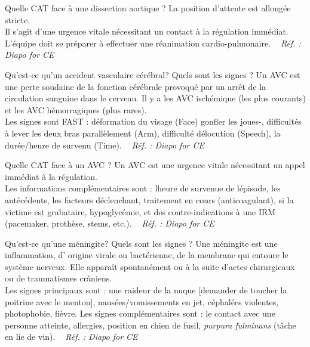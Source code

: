 \documentclass[grid,avery5371,landscape]{flashcards}
\makeatletter
\newcounter{nocarte}
\newcommand{\categ}[1]{%
  \def\@categ{#1}%
  \setcounter{nocarte}{0}%
}
\newcommand{\source}[1]{%
  \medskip
  \itshape%
   ~ \hfill Réf. : #1}
\makeatother
\begin{document}
\color[HTML]{01DF01}
\categ{CE-CP-REG}
\begin{flashcard}[CAT]{
 Quelle CAT face à une dissection aortique ?   }
  La position d'attente est allongée stricte. \\
   Il s'agit d'une urgence vitale nécessitant un contact à la régulation immédiat.\\
   L'équipe doit se préparer à effectuer une réanimation cardio-pulmonaire.
  \source{Diapo for CE }
\end{flashcard}


\color[HTML]{01DF01}
\categ{CE-CP-REG}
\begin{flashcard}[bilan]{
 Qu'est-ce qu'un accident vasculaire cérébral? Quels sont les signes ?   }
  Un AVC est une perte soudaine de la fonction cérébrale provoqué par un arrêt de la circulation sanguine dans le cerveau. Il y a les AVC ischémique (les plus courants) et les AVC hémorragiques (plus rares). \\
    Les signes sont FAST : déformation du visage (Face) gonfler les joues-, difficultés à lever les deux bras parallèlement (Arm), difficulté délocution (Speech), la durée/heure de survenu (Time).
  \source{Diapo for CE }
\end{flashcard}


\color[HTML]{01DF01}
\categ{CE-CP-REG}
\begin{flashcard}[CAT]{
 Quelle CAT face à un AVC ?   }
  Un AVC est une urgence vitale nécessitant un appel immédiat à la régulation. \\
    Les informations complémentaires sont : lheure de survenue de lépisode, les antécédents, les facteurs déclenchant, traitement en cours (anticoagulant), si la victime est grabataire, hypoglycémie, et des contre-indications à une IRM (pacemaker, prothèse, stems, etc.).
  \source{Diapo for CE }
\end{flashcard}


\color[HTML]{01DF01}
\categ{CE-CP-REG}
\begin{flashcard}[bilan]{
 Qu'est-ce qu'une méningite? Quels sont les signes ?   }
  Une méningite est une inflammation, d' origine virale ou bactérienne, de la membrane qui entoure le système nerveux.  Elle apparaît spontanément ou à la suite d'actes chirurgicaux ou de traumatismes crâniens. \\
    Les signes principaux sont : une raideur de la nuque [demander de toucher la poitrine avec le menton], nausées/vomissements en jet, céphalées violentes, photophobie, fièvre. Les signes complémentaires sont : le contact avec une personne atteinte, allergies, position en chien de fusil, \textit{purpura fulminans} (tâche en lie de vin).
  \source{Diapo for CE }
\end{flashcard}
\end{document}
